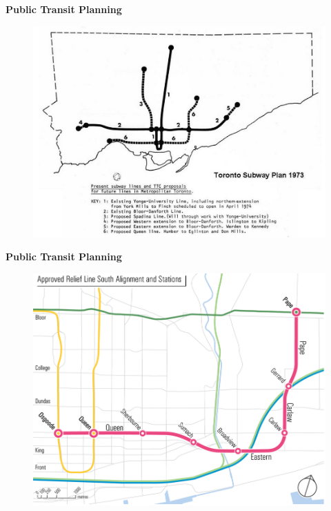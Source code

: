 \documentclass[aspectratio=169]{beamer}
\begin{document}
\begin{frame}
	
	\textbf{Public Transit Planning}

	
	\begin{figure}
		\centering
		\includegraphics[width=0.8\linewidth]{images/toronto_plan_1973.png}
	\end{figure}
	
	
\end{frame}



\begin{frame}
	
	\textbf{Public Transit Planning}
	
	
	
	\begin{figure}
		\centering
		\includegraphics[width=0.8\linewidth]{images/toronto_plan_2019.png}
	\end{figure}
	
	
\end{frame}
\end{document}
